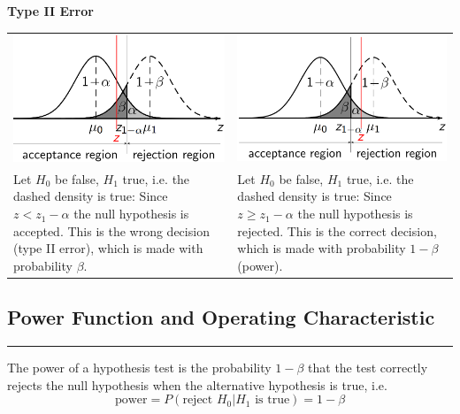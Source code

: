 \textbf{Type II Error}\\
\begin{table}[H]
  \setlength{\tabcolsep}{0.0em}
  \scriptsize
  \begin{tabular}{p{}@{\hskip 1em}p{}}
    \includegraphics[width=\linewidth]{Pics/3.2.3.png}& \includegraphics[width=\linewidth]{Pics/3.2.4.png} \\
    Let $H_0$ be false, $H_1$ true, i.e. the dashed density is true: Since $z < z_1-\alpha$ the null hypothesis is accepted. This is the wrong decision (type II error), which is made with probability $\beta$. &
    Let $H_0$ be false, $H_1$ true, i.e. the dashed density is true: Since $z \geq z_1-\alpha$ the null hypothesis is rejected. This is the correct decision, which is made with probability $1 - \beta$ (power).
  \end{tabular}
\end{table}

\subsection{Power Function and Operating Characteristic}
\noindent\rule[\linienAbstand]{\linewidth}{\linienDicke}
The power of a hypothesis test is the probability $1-\beta$ that the test correctly rejects the null hypothesis when the alternative hypothesis is true, i.e.
\begin{equation}
  \text{power} = P(\text{reject } H_0 | H_1 \text{ is true}) = 1-\beta
\end{equation}

